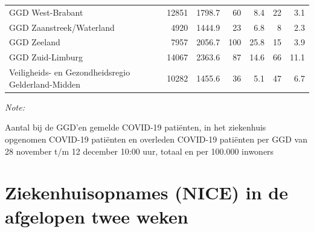 \documentclass[
  english,
  man,floatsintext]{apa6}
\begin{document}
\begin{table}
\begin{threeparttable}
\begin{tabular}{lrrrrrr}
GGD West-Brabant & 12851 & 1798.7 & 60 & 8.4 & 22 & 3.1\\
GGD Zaanstreek/Waterland & 4920 & 1444.9 & 23 & 6.8 & 8 & 2.3\\
GGD Zeeland & 7957 & 2056.7 & 100 & 25.8 & 15 & 3.9\\
GGD Zuid-Limburg & 14067 & 2363.6 & 87 & 14.6 & 66 & 11.1\\
Veiligheids- en Gezondheidsregio Gelderland-Midden & 10282 & 1455.6 & 36 & 5.1 & 47 & 6.7\\
\bottomrule
\end{tabular}
\begin{tablenotes}
\item \textit{Note: } 
\item Aantal bij de GGD’en gemelde COVID-19 patiënten, in het ziekenhuis opgenomen COVID-19 patiënten en overleden COVID-19 patiënten per GGD van 28 november t/m 12 december 10:00 uur, totaal en per 100.000 inwoners
\end{tablenotes}
\end{threeparttable}
\endgroup{}
\end{table}

\newpage

\hypertarget{ziekenhuisopnames-nice-in-de-afgelopen-twee-weken}{%
\section{Ziekenhuisopnames (NICE) in de afgelopen twee weken}\label{ziekenhuisopnames-nice-in-de-afgelopen-twee-weken}}
\end{document}
